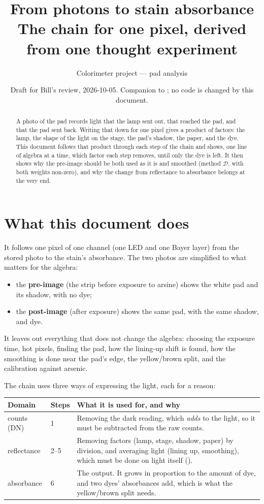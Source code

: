 \documentclass[11pt,letter]{article}
\title{From photons to stain absorbance\\
\large The chain for one pixel, derived from one thought experiment}
\author{Colorimeter project --- pad analysis}
\date{Draft for Bill's review, 2026-10-05.  Companion to
\file{analysis\_chain.tex}; no code is changed by this document.}
\newcommand{\MD}{\mathcal{D}}
\begin{document}
\maketitle

\begin{abstract}
\noindent
A photo of the pad records light that the lamp sent out, that reached the
pad, and that the pad sent back.  Writing that down for one pixel gives a
product of factors: the lamp, the shape of the light on the stage, the
pad's shadow, the paper, and the dye.  This document follows that product
through each step of the chain and shows, one line of algebra at a time,
which factor each step removes, until only the dye is left.  It then shows
why the pre-image should be both used as it is and smoothed (method
$\MD$, with both weights non-zero), and why the change from reflectance to
absorbance belongs at the very end.
\end{abstract}

\tableofcontents

\section{What this document does}
\label{sec:scope}

It follows one pixel of one channel (one LED and one Bayer layer) from the
stored photo to the stain's absorbance.  The two photos are simplified to
what matters for the algebra:
\begin{itemize}[nosep]
  \item the \textbf{pre-image} (the strip before exposure to arsine) shows
    the white pad and its shadow, with no dye;
  \item the \textbf{post-image} (after exposure) shows the same pad, with
    the same shadow, and dye.
\end{itemize}
It leaves out everything that does not change the algebra: choosing the
exposure time, hot pixels, finding the pad, how the lining-up shift is
found, how the smoothing is done near the pad's edge, the yellow/brown
split, and the calibration against arsenic.

\medskip
\noindent The chain uses three ways of expressing the light, each for a
reason:

\medskip
\begin{tabular}{@{}L{2.6cm}L{2.0cm}L{10.0cm}@{}}
\toprule
Domain & Steps & What it is used for, and why \\
\midrule
counts (DN) & 1 & Removing the dark reading, which \emph{adds} to the
  light, so it must be subtracted from the raw counts. \\
reflectance & 2--5 & Removing factors (lamp, stage, shadow, paper) by
  division, and averaging light (lining up, smoothing), which must be done
  on light itself (). \\
absorbance & 6 & The output.  It grows in proportion to the amount of dye,
  and two dyes' absorbances add, which is what the yellow/brown split
  needs. \\
\bottomrule
\end{tabular}
\end{document}
